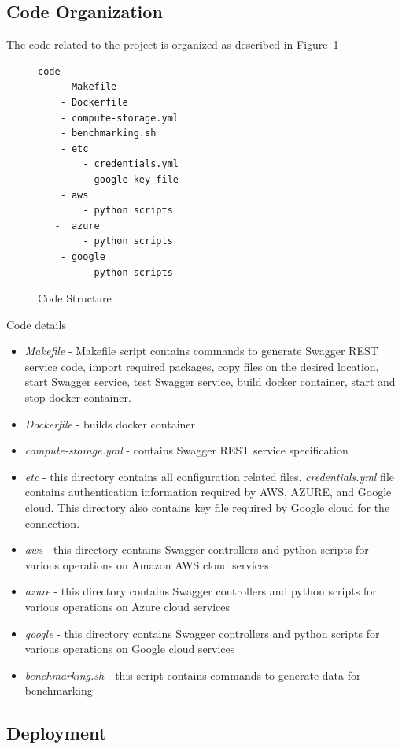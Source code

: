 \subsection{Code Organization}


The code related to the project is organized as described in
Figure~\ref{c:code-structure}
\begin{figure}[htb]
\begin{verbatim}
code
    - Makefile
    - Dockerfile
    - compute-storage.yml
    - benchmarking.sh
    - etc
        - credentials.yml
        - google key file
    - aws
        - python scripts
   -  azure
        - python scripts
    - google
        - python scripts
\end{verbatim}
\caption{Code Structure}\label{c:code-structure}
\end{figure}

Code details
\begin{itemize}
\item \emph{Makefile} - Makefile script contains commands to
generate Swagger REST service code, import required packages,
copy files on the desired location, start Swagger service, test
Swagger service, build docker container, start and stop docker
container.
\item \emph{Dockerfile} - builds docker container
\item \emph{compute-storage.yml} - contains Swagger REST service
specification
\item \emph{etc} - this directory contains all configuration related files.
\emph{credentials.yml} file contains
authentication information required by AWS, AZURE, and Google
cloud. This directory also contains key file required by Google cloud for the
connection.
\item \emph{aws} - this directory contains Swagger controllers 
and python scripts for various operations on Amazon AWS cloud services
\item \emph{azure} - this directory contains Swagger controllers
and python scripts for various operations on Azure cloud services
\item \emph{google} - this directory contains Swagger controllers
and python scripts for various operations on Google cloud services
\item \emph{benchmarking.sh} - this script contains commands to generate data
for benchmarking
\end{itemize}

\subsection{Deployment}

